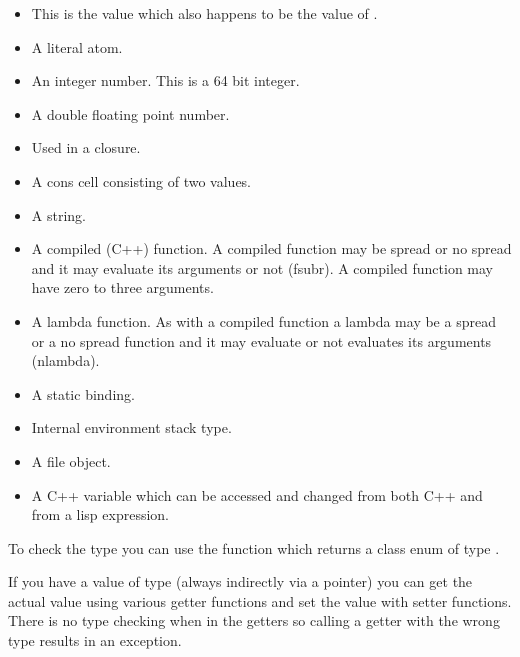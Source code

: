 \begin{itemize}
  \item[\cpp{Nil}] This is the value  which also happens to be the
     value of .
  \item[\cpp{Symbol}] A literal atom.
  \item[\cpp{Integer}] An integer number. This is a 64 bit integer.
  \item[\cpp{Float}] A double floating point number.
  \item[\cpp{Indirect}] Used in a closure.
  \item[\cpp{Cons}] A cons cell consisting of two  values.
  \item[\cpp{String}] A string.
  \item[\cpp{Subr}] A compiled (\textsf{C++}) function. A compiled
    function may be spread or no spread and it may evaluate its
    arguments or not (fsubr). A compiled function may have zero to
    three arguments.
  \item[\cpp{Lambda}] A lambda function. As with a compiled function a
    lambda may be a spread or a no spread function and it may evaluate
    or not evaluates its arguments (nlambda).
  \item[\cpp{Closure}] A static binding.
  \item[\cpp{Environ}] Internal environment stack type.
  \item[\cpp{File}] A file object.
  \item[\cpp{Cvariable}] A \textsf{C++} variable which can be accessed
    and changed from both \textsf{C++} and from a lisp expression.
\end{itemize}

To check the type you can use the  function which
returns a class enum of type .

If you have a value of type  (always indirectly via a
 pointer) you can get the actual value using various
getter functions and set the value with setter functions. There is no
type checking when in the getters so calling a getter with the wrong
type results in an exception.


